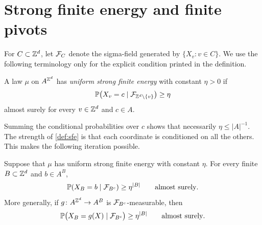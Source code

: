 \section{Strong finite energy and finite pivots}
\label{sec:finite-energy}

For $C\subset\mathbb{Z}^d$, let $\mathcal{F}_C$ denote the sigma-field generated by
$\{X_v:v\in C\}$.  We use the following terminology only for the explicit
condition printed in the definition.

\begin{definition}\label{def:sfe}
A law $\mu$ on $A^{\mathbb{Z}^d}$ has \emph{uniform strong finite energy} with
constant $\eta>0$ if
\[
  \mathbb{P}\bigl(X_v=c\mid\mathcal{F}_{\mathbb{Z}^d\setminus\{v\}}\bigr)\geq\eta
\]
almost surely for every $v\in\mathbb{Z}^d$ and $c\in A$.
\end{definition}

Summing the conditional probabilities over $c$ shows that necessarily
$\eta\leq |A|^{-1}$.  The strength of \cref{def:sfe} is that each coordinate
is conditioned on all the others.  This makes the following iteration
possible.

\begin{lemma}\label{lem:block}
Suppose that $\mu$ has uniform strong finite energy with constant $\eta$.
For every finite $B\subset\mathbb{Z}^d$ and $b\in A^B$,
\begin{equation}\label{eq:block-bound}
  \mathbb{P}(X_B=b\mid\mathcal{F}_{B^c})\geq\eta^{|B|}
  \qquad\text{almost surely}.
\end{equation}
More generally, if $g\colon A^{\mathbb{Z}^d}\to A^B$ is
$\mathcal{F}_{B^c}$-measurable, then
\begin{equation}\label{eq:random-target}
  \mathbb{P}\bigl(X_B=g(X)\mid\mathcal{F}_{B^c}\bigr)\geq\eta^{|B|}
  \qquad\text{almost surely}.
\end{equation}
\end{lemma}

